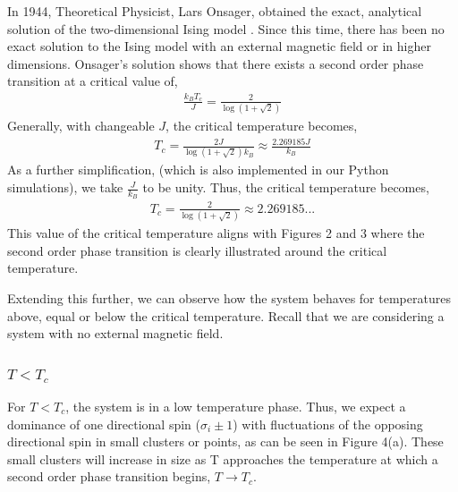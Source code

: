 \documentclass[a4paper]{article}
\begin{document}
In 1944, Theoretical Physicist, Lars Onsager, obtained the exact, analytical solution of the two-dimensional Ising model \cite{9}. Since this time, there has been no exact solution to the Ising model with an external magnetic field or in higher dimensions. Onsager's solution shows that there exists a second order phase transition at a critical value of,
\begin{align*}
\frac{k_{B}T_{c}}{J} = \frac{2}{\log(1 + \sqrt{2})}
\end{align*}
\cite{8} Generally, with changeable $J$, the critical temperature becomes, 
\begin{align*}
T_{c} = \frac{2J}{\log(1 + \sqrt{2})k_{B}} \approx \frac{2.269185J}{k_{B}}
\end{align*}
As a further simplification, (which is also implemented in our Python simulations), we take $\frac{J}{k_{ B}}$ to be unity. Thus, the critical temperature becomes, 
\begin{align*}
T_{c} = \frac{2}{\log(1 + \sqrt{2})} \approx 2.269185...
\end{align*}
This value of the critical temperature aligns with Figures 2 and 3 where the second order phase transition is clearly illustrated around the critical temperature.

Extending this further, we can observe how the system behaves for temperatures above, equal or below the critical temperature. Recall that we are considering a system with no external magnetic field.

\subsubsection{$T < T_{c}$}

For $T < T_{c}$, the system is in a low temperature phase. Thus, we expect a dominance of one directional spin ($\sigma_{i} \pm 1$) with fluctuations of the opposing directional spin in small clusters or points, as can be seen in Figure 4(a). These small clusters will increase in size as T approaches the temperature at which a second order phase transition begins, $T \rightarrow T_{c}$.
\end{document}
